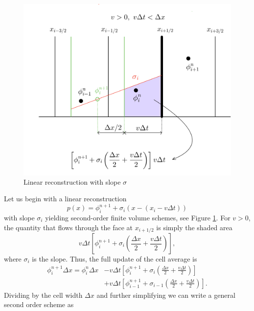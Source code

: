 \documentclass[../thesis.tex]{subfiles}
\begin{document}
\begin{figure}[H]
	\centering
	\includegraphics[width=\textwidth]{2nd-order-crop.pdf}
	\caption{Linear reconstruction with slope \(\sigma\)}
	\label{fig:linear-rec-1d}
\end{figure}
Let us begin with a linear reconstruction
\begin{equation}\label{eqn:linear-rec-poly}
    p(x) = \phi_{i}^{n+1} + \sigma_{i}\left( x - (x_{i}-v\Delta t) \right)
\end{equation}
with slope \(\sigma_{i}\) yielding second-order finite volume schemes, see Figure \ref{fig:linear-rec-1d}.
For \(v>0\), the quantity that flows through the face at \(x_{i+1/2}\) is simply the shaded area
\[ v\Delta t\left[
    \phi_{i}^{n+1} + \sigma_{i}\left( \frac{\Delta x}{2} + \frac{v\Delta t}{2} \right)
\right], \]
where \(\sigma_{i}\) is the slope.
Thus, the full update of the cell average is
\begin{equation}
    \begin{split}
        \phi_{i}^{n+1}\Delta x
        =
        \phi_{i}^{n}\Delta x
        &-v\Delta t\left[
            \phi_{i}^{n+1} + \sigma_{i}\left( \frac{\Delta x}{2} + \frac{v\Delta t}{2} \right)
        \right]
        \\
        &+v\Delta t\left[
            \phi_{i-1}^{n+1} + \sigma_{i-1}\left( \frac{\Delta x}{2} + \frac{v\Delta t}{2} \right)
        \right].
    \end{split}
\end{equation}
Dividing by the cell width \(\Delta x\) and further simplifying we can write a general second order scheme as
\end{document}
